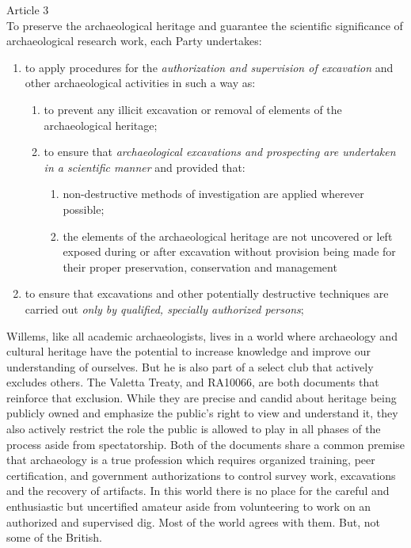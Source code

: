 \begin{displayquote}
	Article 3\\
	To preserve the archaeological heritage and guarantee the scientific significance of archaeological research work, each Party undertakes:
	\begin{enumerate}
		\item to apply procedures for the \textit{authorization and supervision of excavation} and other archaeological activities in such a way as:  
		\begin{enumerate}
			\item to prevent any illicit excavation or removal of elements of the archaeological heritage; 
			\item to ensure that \textit{archaeological excavations and prospecting are undertaken in a scientific manner} and provided that:
			\begin{enumerate}
				\item non-destructive methods of investigation are applied wherever possible;
				\item the elements of the archaeological heritage are not uncovered or left exposed during or after excavation without provision being made for their proper preservation, conservation and management
			\end{enumerate}
		\end{enumerate}
		\item to ensure that excavations and other potentially destructive techniques are carried out \textit{only by qualified, specially authorized persons}; \parencite{CIA_2001}
	\end{enumerate}
\end{displayquote}


Willems, like all academic archaeologists, lives in a world where archaeology and cultural heritage have the potential to increase knowledge and improve our understanding of ourselves. But he is also part of a select club that actively excludes others. The Valetta Treaty, and RA10066, are both documents that reinforce that exclusion. While they are precise and candid about heritage being publicly owned and emphasize the public’s right to view and understand it, they also actively restrict the role the public is allowed to play in all phases of the process aside from spectatorship.  Both of the documents share a common premise that archaeology is a true profession which requires organized training, peer certification, and government authorizations to control survey work, excavations and the recovery of artifacts. In this world there is no place for the careful and enthusiastic but uncertified amateur aside from volunteering to work on an authorized and supervised dig. Most of the world agrees with them. But, not some of the British.

